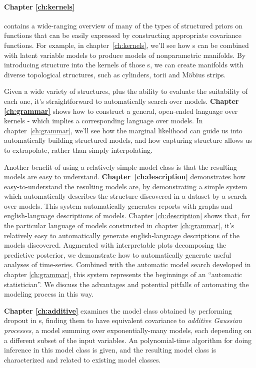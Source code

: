 \paragraph{Chapter \ref{ch:kernels}} contains a wide-ranging overview of many of the types of structured priors on functions that can be easily expressed by constructing appropriate covariance functions.
For example, in chapter~\ref{ch:kernels}, we'll see how \gp{}s can be combined with latent variable models to produce models of nonparametric manifolds.
By introducing structure into the kernels of those \gp{}s, we can create manifolds with diverse topological structures, such as cylinders, torii and M\"obius strips.

Given a wide variety of structures, plus the ability to evaluate the suitability of each one, it's straightforward to automatically search over models.
{\bf Chapter \ref{ch:grammar}} shows how to construct a general, open-ended language over kernels - which implies a corresponding language over models.
In chapter~\ref{ch:grammar}, we'll see how the marginal likelihood can guide us into automatically building structured models, and how capturing structure allows us to extrapolate, rather than simply interpolating.

Another benefit of using a relatively simple model class is that the resulting models are easy to understand.
{\bf Chapter~\ref{ch:description}} demonstrates how easy-to-understand the resulting models are, by demonstrating a simple system which automatically describes the structure discovered in a dataset by a search over \gp{} models.
This system automatically generates reports with graphs and english-language descriptions of \gp{} models.
Chapter \ref{ch:description} shows that, for the particular language of models constructed in chapter \ref{ch:grammar}, it's relatively easy to automatically generate english-language descriptions of the models discovered.
Augmented with interpretable plots decomposing the predictive posterior, we demonstrate how to automatically generate useful analyses of time-series.
Combined with the automatic model search developed in chapter \ref{ch:grammar}, this system represents the beginnings of an ``automatic statistician''.
We discuss the advantages and potential pitfalls of automating the modeling process in this way.

{\bf Chapter \ref{ch:additive}} examines the model class obtained by performing dropout in \gp{}s, finding them to have equivalent covariance to \emph{additive Gaussian processes}, a model summing over exponentially-many \gp{} models, each depending on a different subset of the input variables.  An polynomial-time algorithm for doing inference in this model class is given, and the resulting model class is characterized and related to existing model classes.

